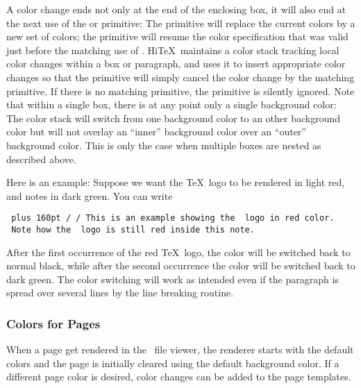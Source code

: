 A color change ends not only at the end of the enclosing box,
it will also end at the next use of the 
or  primitive:
The  primitive will replace the current colors by
a new set of colors; the  primitive will resume
the color specification that was valid just before the matching use
of . Hi\TeX\ maintains a color stack tracking
local color changes within a box or paragraph, and uses it to
insert appropriate color changes so that the  primitive
will simply cancel the color change by the matching  primitive.
If there is no matching  primitive,
the  primitive is silently ignored.
Note that within a single box, there is at any point only a single
background color: The color stack will switch from one background
color to an other background color but will not overlay an ``inner''
background color over an ``outer'' background color.
This is only the case when multiple boxes are nested as described above.

Here is an example:
Suppose we want the \TeX\ logo to be rendered in light red,
and notes in dark green. You can write
\medskip
{\tt\parindent 0pt\rightskip=0pt plus 160pt
\verbatim/\def\redTeX{\HINTcolor{fg{1 0.3 0.3}}\TeX\HINTendcolor}
\def\beginnote{\HINTcolor{fg{0 0.5 0}}}
\def\endnote{\HINTendcolor}/
\medskip
This is an example showing the \BS\ logo in red color.
\ Note how the \BS\ logo is still red inside
this note.\par}
\medskip

After the first occurrence of the red \TeX\ logo, the color will be switched
back to normal black, while after the second occurrence the color will
be switched back to dark green. The color switching will work as intended
even if the paragraph is spread over several lines by the line breaking routine.

\subsubsection{Colors for Pages}
When a page get rendered in the \HINT\ file viewer,
the renderer starts with the default colors and the page is initially
cleared using the default background color. If a different page
color is desired, color changes can be added to the page templates.

